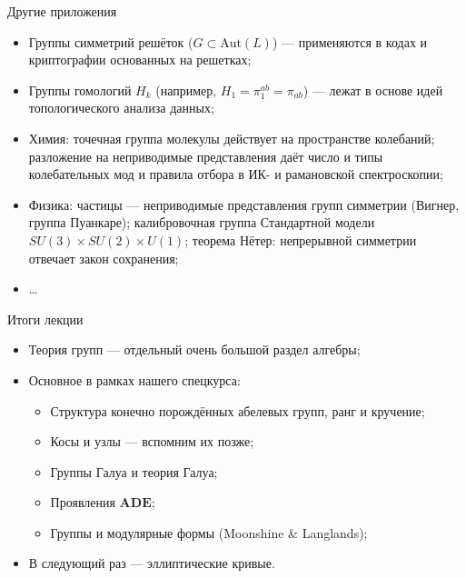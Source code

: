 \documentclass[serif, aspectratio=169]{beamer}
\begin{document}
\begin{frame}{Другие приложения}
    \begin{itemize}
        \item Группы симметрий решёток ($G\subset\mathrm{Aut}(L)$) --- применяются в кодах и криптографии основанных на решетках;
        \item Группы гомологий $H_k$ (например, $H_1=\pi_1^{ab}=\pi_{ab}$) --- лежат в основе идей топологического анализа данных;
        \item Химия: точечная группа молекулы действует на пространстве колебаний; разложение на неприводимые представления даёт число и типы колебательных мод и правила отбора в ИК- и рамановской спектроскопии;
        \item Физика: частицы --- неприводимые представления групп симметрии (Вигнер, группа Пуанкаре); калибровочная группа Стандартной модели $SU(3)\times SU(2)\times U(1)$; теорема Нётер: непрерывной симметрии отвечает закон сохранения;
        \item \dots
    \end{itemize}
    \note{
        \begin{itemize}
            \item ---
        \end{itemize}
    }
\end{frame}

\begin{frame}{Итоги лекции}
    \begin{itemize}
        \item Теория групп --- отдельный очень большой раздел алгебры;
        \item Основное в рамках нашего спецкурса:
        \begin{itemize}
            \item Структура конечно порождённых абелевых групп, ранг и кручение;
            \item Косы и узлы --- вспомним их позже;
            \item Группы Галуа и теория Галуа;
            \item Проявления $\mathbf{ADE}$;
            \item Группы и модулярные формы (Moonshine \& Langlands);
        \end{itemize}
        \item В следующий раз --- эллиптические кривые.
    \end{itemize}
    \note{
        \begin{itemize}
            \item ---
        \end{itemize}
    }
\end{frame}
\end{document}
